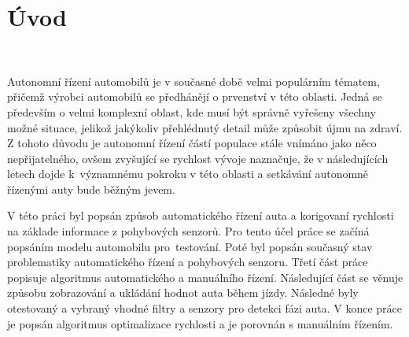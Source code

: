 \chapter*{Úvod}
\label{sec:Introduction}
\

Autonomní řízení automobilů je v současné době velmi populárním tématem, přičemž
výrobci automobilů se předhánějí o prvenství v této oblasti. Jedná se především o
velmi komplexní oblast, kde musí být správně vyřešeny všechny možné situace, jelikož
jakýkoliv přehlédnutý detail může způsobit újmu na zdraví. Z tohoto důvodu je
autonomní řízení částí populace stále vnímáno jako něco  nepřijatelného, ovšem
zvyšující se rychlost vývoje naznačuje, že v následujících letech dojde k~významnému
pokroku v této oblasti a setkávání autonomně řízenými auty bude běžným jevem.

V této práci byl popsán způsob automatického řízení auta a korigovaní rychlosti na
základe informace z pohybových senzorů. Pro tento účel práce se začíná popsáním modelu
automobilu pro~testování. Poté byl popsán současný stav problematiky automatického
řízení a pohybových senzoru. Třetí část práce popisuje algoritmus automatického a
manuálního řízení. Následující část se věnuje způsobu zobrazování a ukládání hodnot
auta během jízdy. Následné byly otestovaný a vybraný vhodné filtry a senzory pro
detekci fázi auta. V konce práce je popsán algoritmus optimalizace rychlosti a je
porovnán s manuálním řízením.

\endinput

